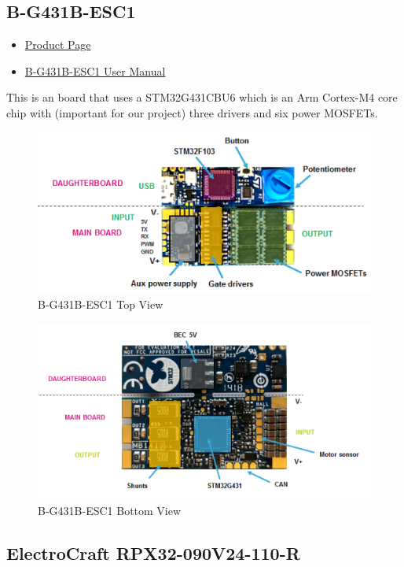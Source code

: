 \documentclass[10pt]{article}
\begin{document}
		\FloatBarrier \subsection{B-G431B-ESC1}
			\begin{itemize}
                \item \href{https://www.st.com/en/evaluation-tools/b-g431b-esc1.html}{Product Page}
                \item \href{../STM32G431/STM32G431 Discovery Kit User Manual.pdf}{B-G431B-ESC1 User Manual}
            \end{itemize}
			This is an board that uses a STM32G431CBU6 which is an Arm Cortex-M4 core chip with (important for our project) three drivers and six power MOSFETs. 
			\begin{figure}[H]
				\centerline{\includegraphics[width=\textwidth]{References/B-G431B-ESC1 top view.png}}
				\caption{B-G431B-ESC1 Top View}
			\end{figure}
			\begin{figure}[H]
				\centerline{\includegraphics[width=\textwidth]{References/B-G431B-ESC1 bottom view.png}}
				\caption{B-G431B-ESC1 Bottom View}
			\end{figure}
		\FloatBarrier \subsection{ElectroCraft RPX32-090V24-110-R}
\end{document}
